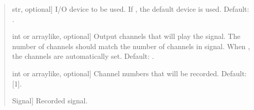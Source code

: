 \documentclass[letterpaper,10pt,english]{sphinxmanual}
\begin{document}
\begin{fulllineitems}
\begin{quote}
\begin{description}
\begin{description}
\sphinxlineitem{\sphinxstylestrong{device}}{[}str, optional{]}
\sphinxAtStartPar
I/O device to be used. If , the default device is used.
Default: .

\sphinxlineitem{\sphinxstylestrong{play\_channels}}{[}int or array\sphinxhyphen{}like, optional{]}
\sphinxAtStartPar
Output channels that will play the signal. The number of channels
should match the number of channels in signal. When , the
channels are automatically set. Default: .

\sphinxlineitem{\sphinxstylestrong{rec\_channels}}{[}int or array\sphinxhyphen{}like, optional{]}
\sphinxAtStartPar
Channel numbers that will be recorded. Default: {[}1{]}.

\end{description}

\begin{description}
\sphinxlineitem{\sphinxstylestrong{rec\_sig}}{[}Signal{]}
\sphinxAtStartPar
Recorded signal.

\end{description}

\end{description}\end{quote}

\end{fulllineitems}

\end{document}
